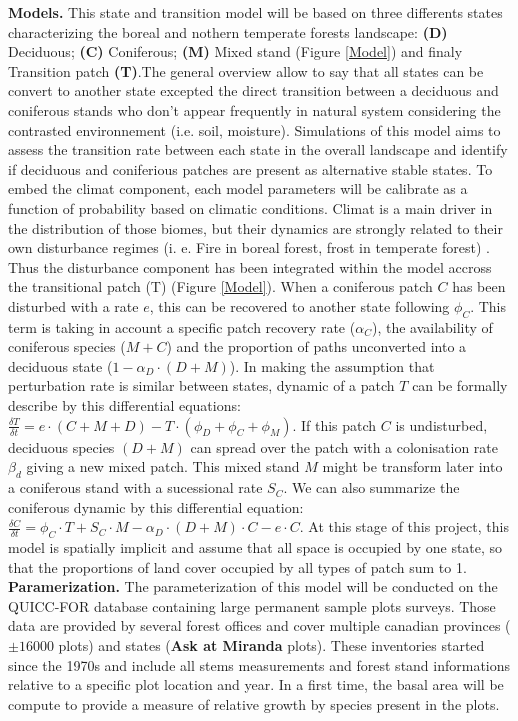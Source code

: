 \textbf{Models.} This state and transition model will be based on three
differents states characterizing the boreal and nothern temperate forests
landscape: \textbf{(D)} Deciduous; \textbf{(C)} Coniferous;  \textbf{(M)}
Mixed stand (Figure \ref{Model}) and finaly Transition patch \textbf{(T)}.The
general overview allow to say that all states can be convert to another state
excepted the direct transition between a deciduous  and coniferous stands who
don't appear frequently in natural system considering the contrasted
environnement (i.e. soil, moisture).  Simulations of this model aims to assess
the transition rate between each state in the overall landscape and identify
if deciduous and coniferious patches are present as alternative stable states.
To embed the climat component, each model parameters will be calibrate as a
function of probability based on climatic conditions. Climat is a main driver
in the distribution of those biomes, but their dynamics are strongly related
to their own disturbance regimes (i. e. Fire in boreal forest, frost in
temperate forest) \cite{Goldblum2010}.  Thus the disturbance component has
been integrated within the model accross the transitional patch (T) (Figure
\ref{Model}). When a coniferous patch $C$ has been disturbed with a rate $e$,
this can be recovered to another state following $\phi_C$. This term is taking
in account a specific patch recovery rate ($\alpha_{C}$), the availability of
coniferous species ($M+C$) and the proportion of paths unconverted into a
deciduous state ($1- \alpha_D \cdot (D +M)$). In making the assumption that
perturbation rate is similar between states, dynamic of a patch $T$ can be
formally describe by this differential equations: $\frac{\delta T}{\delta t} =
e \cdot (C+M+D) -  T \cdot (\phi_D + \phi_C + \phi_M)$. If this patch $C$ is
undisturbed, deciduous species $(D+M)$ can spread over the patch with a
colonisation rate $\beta_d$  giving a new mixed patch. This mixed stand $M$
might be transform later into a coniferous stand with a sucessional rate
$S_C$.  We can also summarize the coniferous dynamic by this differential
equation: $\frac{\delta C}{\delta t} = \phi_C \cdot T + S_C \cdot M - \alpha_D \cdot
(D+M)\cdot C - e \cdot C$. At this stage of this project, this model is
spatially implicit and assume that all space is occupied by one state, so that
the proportions of land cover occupied by all types of patch sum to 1.  \\

\textbf{Paramerization.} The parameterization of this model will be conducted
on the QUICC-FOR database containing large permanent sample plots surveys.
Those data are provided by several forest offices and cover multiple canadian
provinces ($\pm16 000$ plots) and states (\textbf{Ask at Miranda} plots).
These inventories started since the 1970s and include all stems measurements
and forest stand informations relative to a specific plot location and year.
In a first time, the basal area will be compute to provide a measure of
relative growth by species present in the plots. \\

